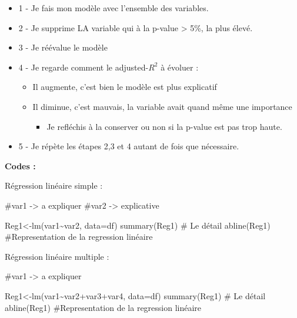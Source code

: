 \documentclass[
  letterpaper,
  DIV=11,
  numbers=noendperiod]{scrartcl}
\newenvironment{Shaded}{\begin{snugshade}}{\end{snugshade}}
\newcommand{\AttributeTok}[1]{\textcolor[rgb]{0.40,0.45,0.13}{#1}}
\newcommand{\CommentTok}[1]{\textcolor[rgb]{0.37,0.37,0.37}{#1}}
\newcommand{\FunctionTok}[1]{\textcolor[rgb]{0.28,0.35,0.67}{#1}}
\newcommand{\NormalTok}[1]{\textcolor[rgb]{0.00,0.23,0.31}{#1}}
\newcommand{\OtherTok}[1]{\textcolor[rgb]{0.00,0.23,0.31}{#1}}
\newcommand{\SpecialCharTok}[1]{\textcolor[rgb]{0.37,0.37,0.37}{#1}}
\providecommand{\tightlist}{%
  \setlength{\itemsep}{0pt}\setlength{\parskip}{0pt}}\usepackage{longtable,booktabs,array}
\begin{document}
\begin{itemize}
\item
  1 - Je fais mon modèle avec l'ensemble des variables.
\item
  2 - Je supprime LA variable qui à la p-value \textgreater{} 5\%, la
  plus élevé.
\item
  3 - Je réévalue le modèle
\item
  4 - Je regarde comment le adjusted-\(R^2\) à évoluer :

  \begin{itemize}
  \item
    Il augmente, c'est bien le modèle est plus explicatif
  \item
    Il diminue, c'est mauvais, la variable avait quand même une
    importance

    \begin{itemize}
    \tightlist
    \item
      Je refléchis à la conserver ou non si la p-value est pas trop
      haute.
    \end{itemize}
  \end{itemize}
\item
  5 - Je répète les étapes 2,3 et 4 autant de fois que nécessaire.
\end{itemize}

\textbf{Codes :}

Régression linéaire simple :

\begin{Shaded}
\begin{Highlighting}[]
\CommentTok{\#var1 {-}\textgreater{} a expliquer}
\CommentTok{\#var2 {-}\textgreater{} explicative}

\NormalTok{Reg1}\OtherTok{\textless{}{-}}\FunctionTok{lm}\NormalTok{(var1}\SpecialCharTok{\textasciitilde{}}\NormalTok{var2, }\AttributeTok{data=}\NormalTok{df)}
\FunctionTok{summary}\NormalTok{(Reg1) }\CommentTok{\# Le détail }
\FunctionTok{abline}\NormalTok{(Reg1) }\CommentTok{\#Representation de la regression linéaire }
\end{Highlighting}
\end{Shaded}

Régression linéaire multiple :

\begin{Shaded}
\begin{Highlighting}[]
\CommentTok{\#var1 {-}\textgreater{} a expliquer}

\NormalTok{Reg1}\OtherTok{\textless{}{-}}\FunctionTok{lm}\NormalTok{(var1}\SpecialCharTok{\textasciitilde{}}\NormalTok{var2}\SpecialCharTok{+}\NormalTok{var3}\SpecialCharTok{+}\NormalTok{var4, }\AttributeTok{data=}\NormalTok{df)}
\FunctionTok{summary}\NormalTok{(Reg1) }\CommentTok{\# Le détail }
\FunctionTok{abline}\NormalTok{(Reg1)  }\CommentTok{\#Representation de la regression linéaire }
\end{Highlighting}
\end{Shaded}
\end{document}
